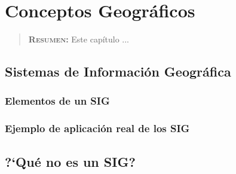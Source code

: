 

\chapter{Conceptos Geográficos}
\label{ch:sig}

\begin{quote}
  {\bf\textsc{Resumen:}} Este capítulo ...
\end{quote}


\section{Sistemas de Información Geográfica}




\subsection{Elementos de un SIG}


\subsection{Ejemplo de aplicación real de los SIG}



\section{?`Qué no es un SIG?}




